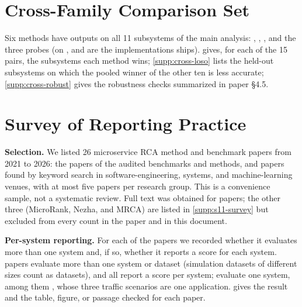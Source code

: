 \documentclass[10pt]{article}
\begin{document}


\section{Cross-Family Comparison Set}
\label{supp:cross-sec}
Six methods have outputs on all 11 subsystems of the main analysis: \baro, \rcd, \ediag, and the three probes (on \petshop, \rcd and \ediag are the implementations \petshop ships).  gives, for each of the 15 pairs, the subsystems each method wins; \cref{supp:cross-loso} lists the held-out subsystems on which the pooled winner of the other ten is less accurate; \cref{supp:cross-robust} gives the robustness checks summarized in paper \S4.5.

\begin{table}[h]
\centering
\caption{Cross-family set: the six methods with outputs on all 11 subsystems. Scores are not averaged across families (\openrca partial credit, top-1 accuracy elsewhere). $+$/$-$: subsystems where $A$ / $B$ is more accurate; CI excl.\ 0: of these, subsystems whose 95\% CI excludes zero. Both signs: the number of leave-one-family-out subsets (of three) and leave-two-subsystems-out subsets (of \XLksoPer) on which the pair still has subsystem differences of both signs.}
\label{supp:cross-signs}
\small

\end{table}



\section{Survey of Reporting Practice}
\label{supp:survey-sec}
\textbf{Selection.} We listed 26 microservice RCA method and benchmark papers from 2021 to 2026: the papers of the audited benchmarks and methods, and papers found by keyword search in software-engineering, systems, and machine-learning venues, with at most five papers per research group. This is a convenience sample, not a systematic review. Full text was obtained for \SurveyN papers; the other three (MicroRank, Nezha, and MRCA) are listed in \cref{supp:s11-survey} but excluded from every count in the paper and in this document.

\textbf{Per-system reporting.} For each of the \SurveyN papers we recorded whether it evaluates more than one system and, if so, whether it reports a score for each system. \SurveyMulti papers evaluate more than one system or dataset (simulation datasets of different sizes count as datasets), and all \SurveyMulti report a score per system; \SurveySingle evaluate one system, among them \petshop, whose three traffic scenarios are one application.  gives the result and the table, figure, or passage checked for each paper.
\end{document}
